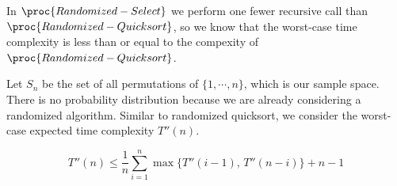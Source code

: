 In $\proc{Randomized-Select}$ we perform one fewer recursive call than $\proc{Randomized-Quicksort}$, so we know that the worst-case time complexity is less than or equal to the compexity of $\proc{Randomized-Quicksort}$.

Let $S_n$ be the set of all permutations of $\{1,\cdots,n\}$, which is our sample space. There is no probability distribution because we are already considering a randomized algorithm. Similar to randomized quicksort, we consider the worst-case expected time complexity $T''(n)$.

$$
T''(n) \leq \frac{1}{n} \sum_{i=1}^n \max \{ T''(i-1),\, T''(n-i) \} + n - 1
$$

